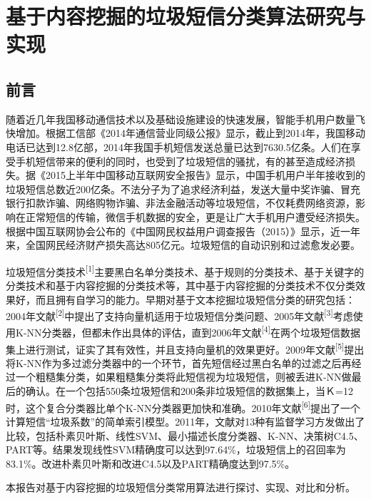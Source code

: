 \section{基于内容挖掘的垃圾短信分类算法研究与实现}\label{ux57faux4e8eux5185ux5bb9ux6316ux6398ux7684ux5783ux573eux77edux4fe1ux5206ux7c7bux7b97ux6cd5ux7814ux7a76ux4e0eux5b9eux73b0}

\subsection{前言}\label{ux524dux8a00}

随着近几年我国移动通信技术以及基础设施建设的快速发展，智能手机用户数量飞快增加。根据工信部《2014年通信营业同级公报》显示，截止到2014年，我国移动电话已达到12.8亿部，2014年我国手机短信发送总量已达到7630.5亿条。人们在享受手机短信带来的便利的同时，也受到了垃圾短信的骚扰，有的甚至造成经济损失。据《2015上半年中国移动互联网安全报告》显示，中国手机用户半年接收到的垃圾短信总数近200亿条。不法分子为了追求经济利益，发送大量中奖诈骗、冒充银行扣款诈骗、网络购物诈骗、非法金融活动等垃圾短信，不仅耗费网络资源，影响在正常短信的传输，微信手机数据的安全，更是让广大手机用户遭受经济损失。根据中国互联网协会公布的《中国网民权益用户调查报告（2015）》显示，近一年来，全国网民经济财产损失高达805亿元。垃圾短信的自动识别和过滤愈发必要。

垃圾短信分类技术\textsuperscript{{[}1{]}}主要黑白名单分类技术、基于规则的分类技术、基于关键字的分类技术和基于内容挖掘的分类技术等，其中基于内容挖掘的分类技术不仅分类效果好，而且拥有自学习的能力。早期对基于文本挖掘垃圾短信分类的研究包括：2004年文献\textsuperscript{{[}2{]}}中提出了支持向量机适用于垃圾短信分类问题、2005年文献\textsuperscript{{[}3{]}}考虑使用K-NN分类器，但都未作出具体的评估，直到2006年文献\textsuperscript{{[}4{]}}在两个垃圾短信数据集上进行测试，证实了其有效性，并且支持向量机的效果更好。2009年文献\textsuperscript{{[}5{]}}提出将K-NN作为多过滤分类器中的一个环节，首先短信经过黑白名单的过滤之后再经过一个粗糙集分类，如果粗糙集分类将此短信视为垃圾短信，则被丢进K-NN做最后的确认。在一个包括550条垃圾短信和200条非垃圾短信的数据集上，当Ｋ=12时，这个复合分类器比单个K-NN分类器更加快和准确。2010年文献\textsuperscript{{[}6{]}}提出了一个计算短信``垃圾系数''的简单索引模型。2011年，文献对13种有监督学习方发做出了比较，包括朴素贝叶斯、线性SVM、最小描述长度分类器、K-NN、决策树C4.5、PART等。结果发现线性SVM精确度可以达到97.64\%，垃圾短信上的召回率为83.1\%。改进朴素贝叶斯和改进C4.5以及PART精确度达到97.5\%。

本报告对基于内容挖掘的垃圾短信分类常用算法进行探讨、实现、对比和分析。

